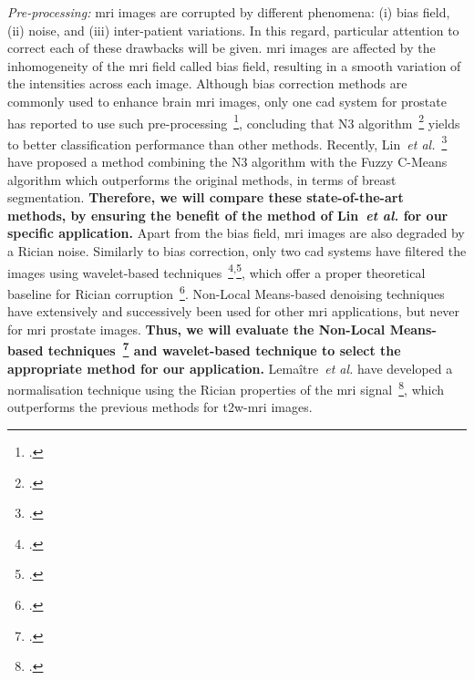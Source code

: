 \emph{Pre-processing:}
\Ac{mri} images are corrupted by different phenomena: (i) bias field, (ii) noise, and (iii) inter-patient variations.
In this regard, particular attention to correct each of these drawbacks will be given.
\Ac{mri} images are affected by the inhomogeneity of the \ac{mri} field called bias field, resulting in a smooth variation of the intensities across each image.
Although bias correction methods are commonly used to enhance brain \ac{mri} images, only one \ac{cad} system for prostate has reported to use such pre-processing~\footcite{Viswanath2009}, concluding that N3 algorithm~\footcite{Sled1998} yields to better classification performance than other methods.
Recently, Lin~\emph{et al.}~\footcite{Lin2011} have proposed a method combining the N3 algorithm with the Fuzzy C-Means algorithm which outperforms the original methods, in terms of breast segmentation.
\textbf{Therefore, we will compare these state-of-the-art methods, by ensuring the benefit of the method of Lin~\emph{et al.} for our specific application.}
Apart from the bias field, \Ac{mri} images are also degraded by a Rician noise. 
Similarly to bias correction, only two \ac{cad} systems have filtered the images using wavelet-based techniques~\footcite{Mallat2008}\textsuperscript{,}\footcite{Pizurica2003}, which offer a proper theoretical baseline for Rician corruption~\footcite{Nowak1999}.
Non-Local Means-based denoising techniques have extensively and successively been used for other \ac{mri} applications, but never for \ac{mri} prostate images.
\textbf{Thus, we will evaluate the Non-Local Means-based techniques~\footcite{Manjon2012} and wavelet-based technique to select the appropriate method for our application.}
Lema\^itre~\emph{et al.} have developed a normalisation technique using the Rician properties of the \ac{mri} signal~\footcite{lemaitre2016normalization}, which outperforms the previous methods for \ac{t2w}-\ac{mri} images.

